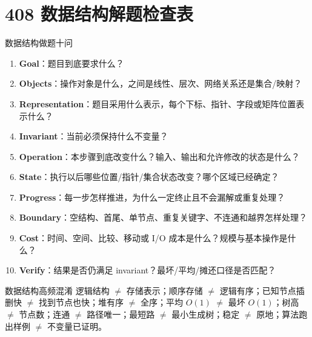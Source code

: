 \documentclass[11pt,a4paper,openany]{ctexbook}
\newcommand{\key}[1]{\textbf{\color{deep}#1}}
\begin{document}
\section{408 数据结构解题检查表}
\begin{examBox}{数据结构做题十问}
\begin{enumerate}
  \item \key{Goal}：题目到底要求什么？
  \item \key{Objects}：操作对象是什么，之间是线性、层次、网络关系还是集合/映射？
  \item \key{Representation}：题目采用什么表示，每个下标、指针、字段或矩阵位置表示什么？
  \item \key{Invariant}：当前必须保持什么不变量？
  \item \key{Operation}：本步骤到底改变什么？输入、输出和允许修改的状态是什么？
  \item \key{State}：执行以后哪些位置/指针/集合状态改变？哪个区域已经确定？
  \item \key{Progress}：每一步怎样推进，为什么一定终止且不会漏解或重复处理？
  \item \key{Boundary}：空结构、首尾、单节点、重复关键字、不连通和越界怎样处理？
  \item \key{Cost}：时间、空间、比较、移动或 I/O 成本是什么？规模与基本操作是什么？
  \item \key{Verify}：结果是否仍满足 invariant？最坏/平均/摊还口径是否匹配？
\end{enumerate}
\end{examBox}

\begin{warnbox}{数据结构高频混淆}
逻辑结构 $\neq$ 存储表示；顺序存储 $\neq$ 逻辑有序；已知节点插删快 $\neq$ 找到节点也快；堆有序 $\neq$ 全序；平均 $O(1)$ $\neq$ 最坏 $O(1)$；树高 $\neq$ 节点数；连通 $\neq$ 路径唯一；最短路 $\neq$ 最小生成树；稳定 $\neq$ 原地；算法跑出样例 $\neq$ 不变量已证明。
\end{warnbox}
\end{document}
